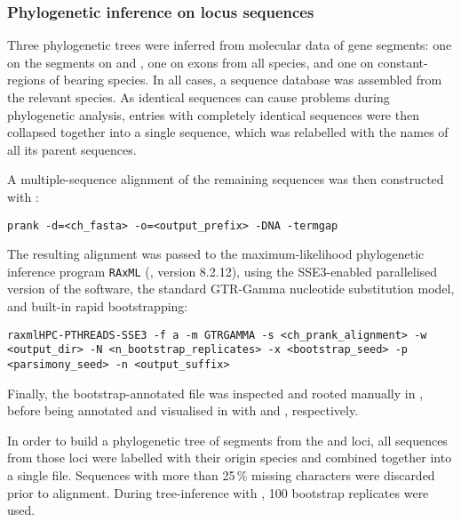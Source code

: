 \subsubsection{Phylogenetic inference on \igh{} locus sequences}
\label{sec:methods_comp_trees_phylo}

Three phylogenetic trees were inferred from molecular data of  gene segments: one on the \vh segments on \nfu and \xma, one on \ch exons from all species, and one on  constant-regions of  bearing species. In all cases, a sequence  database was assembled from the relevant species. As identical sequences can cause problems during phylogenetic analysis, entries with completely identical sequences  were then collapsed together into a single  sequence, which was relabelled with the names of all its parent sequences. 

A multiple-sequence alignment of the remaining sequences was then constructed with :

\begin{lstlisting}
prank -d=<ch_fasta> -o=<output_prefix> -DNA -termgap
\end{lstlisting}

\noindent The resulting alignment was passed to the maximum-likelihood phylogenetic inference program \lstinline{RAxML} (\parencite{stamatakis2005raxml3,stamatakis2006raxml6,stamatakis2014raxml8}, version 8.2.12), using the SSE3-enabled parallelised version of the software, the standard GTR-Gamma nucleotide substitution model, and built-in rapid bootstrapping:

\begin{lstlisting}
raxmlHPC-PTHREADS-SSE3 -f a -m GTRGAMMA -s <ch_prank_alignment> -w <output_dir> -N <n_bootstrap_replicates> -x <bootstrap_seed> -p <parsimony_seed> -n <output_suffix>
\end{lstlisting} 

\noindent Finally, the bootstrap-annotated  file was inspected and rooted manually in  \parencite{rambaut2012figtree}, before being annotated and visualised in  with  and , respectively.


\noindent In order to build a phylogenetic tree of \vh segments from the \Nfu and \Xma \igh{} loci, all \vh sequences from those loci were labelled with their origin species and combined together into a single  file. Sequences with more than 25\,\% missing characters were discarded prior to  alignment. During tree-inference with , 100 bootstrap replicates were used.

